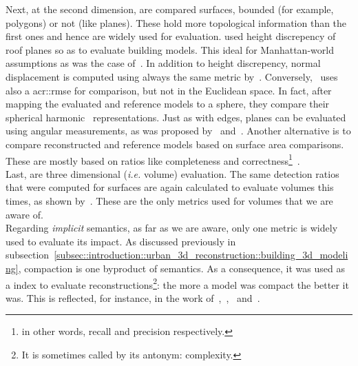             Next, at the second dimension, are compared surfaces, bounded (for example, polygons) or not (like planes).
            These hold more topological information than the first ones and hence are widely used for evaluation.
            \textcite{rottensteiner2014results} used height discrepency of roof planes so as to evaluate building models.
            This ideal for Manhattan-world assumptions as was the case of~\textcite{zebedin2008fusion}.
            In addition to height discrepency, normal displacement is computed using always the same metric by~\textcite{henricsson19973}.
            Conversely,~\textcite{zeng2014multicriteria} uses also a \gls{acr::rmse} for comparison, but not in the Euclidean space.
            In fact, after mapping the evaluated and reference models to a sphere, they compare their spherical harmonic~\parencite{brechbuhler1995parametrization} representations.
            Just as with edges, planes can be evaluated using angular measurements, as was proposed by~\textcite{landes2012quality} and~\textcite{henricsson19973}.
            Another alternative is to compare reconstructed and reference models based on surface area comparisons.
            These are mostly based on ratios like completeness and correctness\footnote{in other words, recall and precision respectively.}~\parencite{rottensteiner2014results,landes2012quality,henricsson19973,schuster2003new}.\\
            Last, are three dimensional (\textit{i.e.} volume) evaluation.
            The same detection ratios that were computed for surfaces are again calculated to evaluate volumes this times, as shown by~\textcite{mohamed2013quality, zeng2014multicriteria,jaynes2003recognition,nguatem2017modeling}.
            These are the only metrics used for volumes that we are aware of.\\

            Regarding \textit{implicit} semantics, as far as we are aware, only one metric is widely used to evaluate its impact.
            As discussed previously in subsection~\ref{subsec::introduction::urban_3d_reconstruction::building_3d_modeling}, compaction is one byproduct of semantics.
            As a consequence, it was used as a index to evaluate reconstructions\footnote{It is sometimes called by its antonym: complexity.}: the more a model was compact the better it was.
            This is reflected, for instance, in the work of~\textcite{lafarge_ijcv12},~\textcite{zhang2017deep},~\textcite{duan_eccv16} and~\textcite{zhu2018large}.

